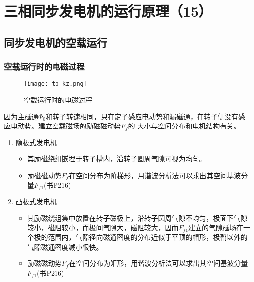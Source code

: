 \documentclass[blue]{elegantnote}
\begin{document}
\chapter{三相同步发电机的运行原理（15）}
\section{同步发电机的空载运行}
\subsection{空载运行时的电磁过程}
\begin{figure}[!hbtp]
	\centering
	\texttt{[image: tb\_kz.png]}
	\caption{空载运行时的电磁过程\label{figur:tb_kz}}
\end{figure}
{\color{thid}因为主磁通$\Phi_0$和转子转速相同，只在定子感应电动势和漏磁通，在转子侧没有感应电动势。}建立空载磁场的励磁磁动势$F_f$的 大小与空间分布和电机结构有关。\\
\begin{enumerate}
	\item 隐极式发电机
	\begin{itemize}
		\item 其励磁绕组嵌埋于转子槽内，沿转子圆周气隙可视为均匀。
		\item 励磁磁动势$F_f$在空间分布为{\color{thid}阶梯形}，用谐波分析法可以求出其空间基波分量$F_{f1}$(书P216)
	\end{itemize}
	\item 凸极式发电机
	\begin{itemize}
		\item 其励磁绕组集中放置在转子磁极上，沿转子圆周气隙不均匀，极面下气隙较小，磁阻较小，而极间气隙大，磁阻较大，因而$F_{f1}$建立的气隙磁场在一个极的范围内，气隙径向磁通密度的分布近似于平顶的帽形，极靴以外的气隙磁通密度减小很快。
		\item 励磁磁动势$F_f$在空间分布为{\color{thid}矩形}，用谐波分析法可以求出其空间基波分量$F_{f1}$(书P216)
	\end{itemize}
\end{enumerate}
\end{document}
